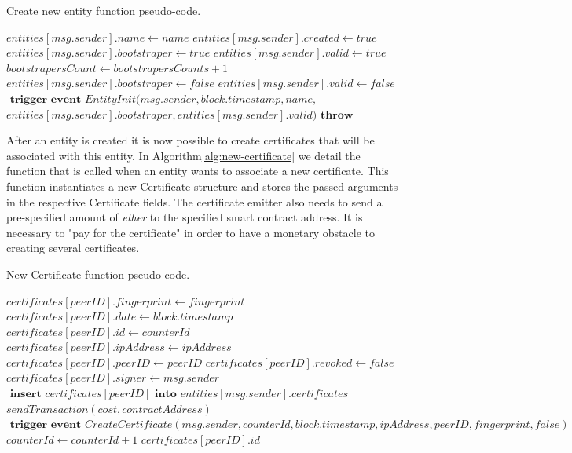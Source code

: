 \begin{algorithm}
  \caption{Create new entity function pseudo-code.}
  \label{alg:create-entity}
  \begin{algorithmic}[1]
        \State $entities[msg.sender].name \gets name$
        \State $entities[msg.sender].created \gets true$
        \State
          \State $entities[msg.sender].bootstraper \gets  true$
          \State $entities[msg.sender].valid \gets true$
          \State $bootstrapersCount \gets bootstrapersCounts + 1$
        \Else
          \State $entities[msg.sender].bootstraper \gets  false$
          \State $entities[msg.sender].valid \gets false$
        \EndIf
          \State
          \State $\textbf{ trigger event } EntityInit(msg.sender, block.timestamp, name,$
          \State $entities[msg.sender].bootstraper, entities[msg.sender].valid)$
      \Else
        \State $\textbf{throw}$
      \EndIf
    \EndFunction
  \end{algorithmic}
\end{algorithm}


After an entity is created it is now possible to create certificates that will be associated with this entity.
In Algorithm\ref{alg:new-certificate} we detail the function that is called when an entity wants to associate a new certificate.
This function instantiates a new Certificate structure and stores the passed arguments in the respective Certificate fields.
The certificate emitter also needs to send a pre-specified amount of \textit{ether} to the specified smart contract address.
It is necessary to "pay for the certificate" in order to have a monetary obstacle to creating several certificates.

\begin{algorithm}
  \caption{New Certificate function pseudo-code.}
\label{alg:new-certificate}
  \begin{algorithmic}[1]
      \State $certificates[peerID].fingerprint \gets fingerprint$
      \State $certificates[peerID].date \gets block.timestamp$
      \State $certificates[peerID].id \gets counterId$
      \State $certificates[peerID].ipAddress \gets ipAddress$
      \State $certificates[peerID].peerID \gets peerID$
      \State $certificates[peerID].revoked \gets false$
      \State $certificates[peerID].signer \gets msg.sender$
      \State 
      \State $\textbf{ insert } certificates[peerID] \textbf{ into } entities[msg.sender].certificates$
      \State $sendTransaction(cost, contractAddress)$ 
      \State 
      \State $\textbf{ trigger event } CreateCertificate(msg.sender, counterId, block.timestamp,\allowbreak ipAddress, peerID, fingerprint, false)$
      \State
      \State $counterId \gets counterId + 1$
      \State 
      \State 
      \Return $certificates[peerID].id$
    \EndFunction
  \end{algorithmic}
\end{algorithm}



